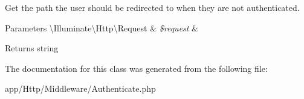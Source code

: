 Get the path the user should be redirected to when they are not authenticated.


\begin{DoxyParams}[1]{Parameters}
\textbackslash{}\+Illuminate\textbackslash{}\+Http\textbackslash{}\+Request & {\em \$request} & \\
\hline
\end{DoxyParams}
\begin{DoxyReturn}{Returns}
string 
\end{DoxyReturn}


The documentation for this class was generated from the following file\+:\begin{DoxyCompactItemize}
\item 
app/\+Http/\+Middleware/Authenticate.\+php\end{DoxyCompactItemize}
